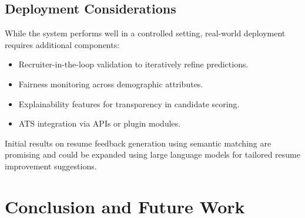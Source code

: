 \documentclass[a4paper]{article}
\begin{document}
\begin{multicols}{2}
\subsection{Deployment Considerations}
While the system performs well in a controlled setting, real-world deployment requires additional components:
\begin{itemize}
    \item Recruiter-in-the-loop validation to iteratively refine predictions.
    \item Fairness monitoring across demographic attributes.
    \item Explainability features for transparency in candidate scoring.
    \item ATS integration via APIs or plugin modules.
\end{itemize}

Initial results on resume feedback generation using semantic matching are promising and could be expanded using large language models for tailored resume improvement suggestions.






\section{Conclusion and Future Work}


\end{multicols}
\end{document}
